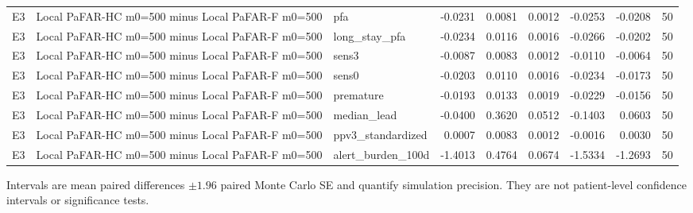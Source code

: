 \begin{table}[tbp]
{\begin{tabular}{lllrrrrrr}
E3 & Local PaFAR-HC m0=500 minus Local PaFAR-F m0=500 & pfa & -0.0231 & 0.0081 & 0.0012 & -0.0253 & -0.0208 & 50 \\
E3 & Local PaFAR-HC m0=500 minus Local PaFAR-F m0=500 & long\_stay\_pfa & -0.0234 & 0.0116 & 0.0016 & -0.0266 & -0.0202 & 50 \\
E3 & Local PaFAR-HC m0=500 minus Local PaFAR-F m0=500 & sens3 & -0.0087 & 0.0083 & 0.0012 & -0.0110 & -0.0064 & 50 \\
E3 & Local PaFAR-HC m0=500 minus Local PaFAR-F m0=500 & sens0 & -0.0203 & 0.0110 & 0.0016 & -0.0234 & -0.0173 & 50 \\
E3 & Local PaFAR-HC m0=500 minus Local PaFAR-F m0=500 & premature & -0.0193 & 0.0133 & 0.0019 & -0.0229 & -0.0156 & 50 \\
E3 & Local PaFAR-HC m0=500 minus Local PaFAR-F m0=500 & median\_lead & -0.0400 & 0.3620 & 0.0512 & -0.1403 & 0.0603 & 50 \\
E3 & Local PaFAR-HC m0=500 minus Local PaFAR-F m0=500 & ppv3\_standardized & 0.0007 & 0.0083 & 0.0012 & -0.0016 & 0.0030 & 50 \\
E3 & Local PaFAR-HC m0=500 minus Local PaFAR-F m0=500 & alert\_burden\_100d & -1.4013 & 0.4764 & 0.0674 & -1.5334 & -1.2693 & 50 \\
\bottomrule
\end{tabular}
}
\vspace{0.35em}
\begin{minipage}{\linewidth}
\footnotesize
\noindent Intervals are mean paired differences $\pm 1.96$ paired Monte Carlo SE and quantify simulation precision. They are not patient-level confidence intervals or significance tests.\par
\end{minipage}
\end{table}
